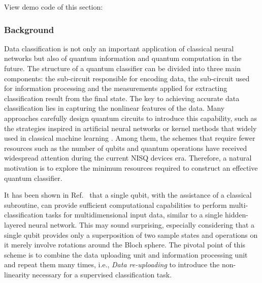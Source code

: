 View demo code of this section: 

\subsubsection{Background}


Data classification is not only an important application of classical neural networks but also of quantum information and quantum computation in the future. The structure of a quantum classifier can be divided into three main components: the sub-circuit responsible for encoding data, the sub-circuit used for information processing and the measurements applied for extracting classification result from the final state.
The key to achieving accurate data classification lies in capturing the nonlinear features of the data. Many approaches carefully design quantum circuits to introduce this capability, such as the strategies inspired in artificial neural networks or kernel methods that widely used in classical machine learning \cite{PhysRevLett.122.040504, 2019Supervised_nature, Wan_2017_npjqi, hur2022quantum, chalumuri2021hybrid, oh2020tutorial, farhi2018classification, wrobel2021application}. Among them, the schemes that require fewer resources such as the number of qubits and quantum operations have received widespread attention during the current NISQ devices era.
Therefore, a natural motivation is to explore the minimum resources required to construct an effective quantum classifier.

It has been shown in Ref.~\cite{PerezSalinas2020datareuploading} that a single qubit, with the assistance of a classical subroutine, can provide sufficient computational capabilities to perform multi-classification tasks for multidimensional input data, similar to a single hidden-layered neural network. This may sound surprising, especially considering that a single qubit provides only a superposition of two sample states and operations on it merely involve rotations around the Bloch sphere.
The pivotal point of this scheme is to combine the data uploading unit and information processing unit and repeat them many times, i.e., \textit{Data re-uploading} to introduce the non-linearity necessary for a supervised classification task.

